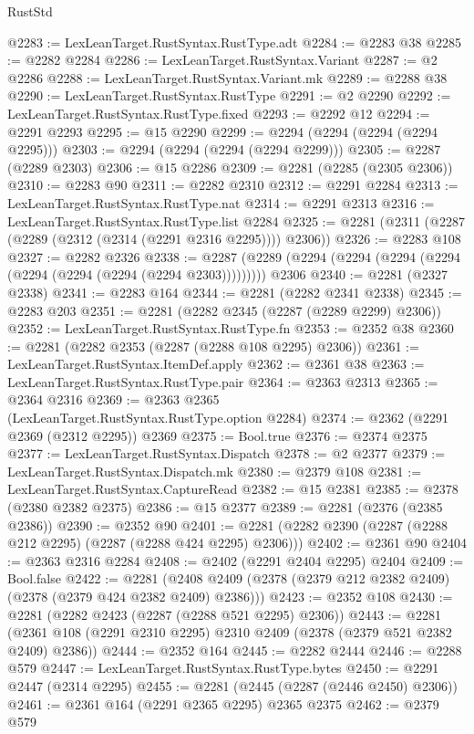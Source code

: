 \begin{lexlean}{RustStd}
\begin{coremodule}
@2283 := LexLeanTarget.RustSyntax.RustType.adt
@2284 := @2283 @38
@2285 := @2282 @2284
@2286 := LexLeanTarget.RustSyntax.Variant
@2287 := @2 @2286
@2288 := LexLeanTarget.RustSyntax.Variant.mk
@2289 := @2288 @38
@2290 := LexLeanTarget.RustSyntax.RustType
@2291 := @2 @2290
@2292 := LexLeanTarget.RustSyntax.RustType.fixed
@2293 := @2292 @12
@2294 := @2291 @2293
@2295 := @15 @2290
@2299 := @2294 (@2294 (@2294 (@2294 @2295)))
@2303 := @2294 (@2294 (@2294 (@2294 @2299)))
@2305 := @2287 (@2289 @2303)
@2306 := @15 @2286
@2309 := @2281 (@2285 (@2305 @2306))
@2310 := @2283 @90
@2311 := @2282 @2310
@2312 := @2291 @2284
@2313 := LexLeanTarget.RustSyntax.RustType.nat
@2314 := @2291 @2313
@2316 := LexLeanTarget.RustSyntax.RustType.list @2284
@2325 := @2281 (@2311 (@2287 (@2289 (@2312 (@2314 (@2291 @2316 @2295)))) @2306))
@2326 := @2283 @108
@2327 := @2282 @2326
@2338 := @2287 (@2289 (@2294 (@2294 (@2294 (@2294 (@2294 (@2294 (@2294 (@2294 @2303))))))))) @2306
@2340 := @2281 (@2327 @2338)
@2341 := @2283 @164
@2344 := @2281 (@2282 @2341 @2338)
@2345 := @2283 @203
@2351 := @2281 (@2282 @2345 (@2287 (@2289 @2299) @2306))
@2352 := LexLeanTarget.RustSyntax.RustType.fn
@2353 := @2352 @38
@2360 := @2281 (@2282 @2353 (@2287 (@2288 @108 @2295) @2306))
@2361 := LexLeanTarget.RustSyntax.ItemDef.apply
@2362 := @2361 @38
@2363 := LexLeanTarget.RustSyntax.RustType.pair
@2364 := @2363 @2313
@2365 := @2364 @2316
@2369 := @2363 @2365 (LexLeanTarget.RustSyntax.RustType.option @2284)
@2374 := @2362 (@2291 @2369 (@2312 @2295)) @2369
@2375 := Bool.true
@2376 := @2374 @2375
@2377 := LexLeanTarget.RustSyntax.Dispatch
@2378 := @2 @2377
@2379 := LexLeanTarget.RustSyntax.Dispatch.mk
@2380 := @2379 @108
@2381 := LexLeanTarget.RustSyntax.CaptureRead
@2382 := @15 @2381
@2385 := @2378 (@2380 @2382 @2375)
@2386 := @15 @2377
@2389 := @2281 (@2376 (@2385 @2386))
@2390 := @2352 @90
@2401 := @2281 (@2282 @2390 (@2287 (@2288 @212 @2295) (@2287 (@2288 @424 @2295) @2306)))
@2402 := @2361 @90
@2404 := @2363 @2316 @2284
@2408 := @2402 (@2291 @2404 @2295) @2404
@2409 := Bool.false
@2422 := @2281 (@2408 @2409 (@2378 (@2379 @212 @2382 @2409) (@2378 (@2379 @424 @2382 @2409) @2386)))
@2423 := @2352 @108
@2430 := @2281 (@2282 @2423 (@2287 (@2288 @521 @2295) @2306))
@2443 := @2281 (@2361 @108 (@2291 @2310 @2295) @2310 @2409 (@2378 (@2379 @521 @2382 @2409) @2386))
@2444 := @2352 @164
@2445 := @2282 @2444
@2446 := @2288 @579
@2447 := LexLeanTarget.RustSyntax.RustType.bytes
@2450 := @2291 @2447 (@2314 @2295)
@2455 := @2281 (@2445 (@2287 (@2446 @2450) @2306))
@2461 := @2361 @164 (@2291 @2365 @2295) @2365 @2375
@2462 := @2379 @579

\end{coremodule}
\end{lexlean}
